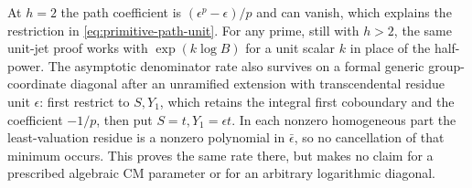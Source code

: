 \documentclass[11pt,a4paper]{article}
\theoremstyle{definition}\newtheorem{remark}[theorem]{Remark}
\begin{document}
At $h=2$ the path coefficient is $(\epsilon^p-\epsilon)/p$ and can vanish, which explains the restriction in \eqref{eq:primitive-path-unit}. For any prime, still with $h>2$, the same unit-jet proof works with $\exp(k\log B)$ for a unit scalar $k$ in place of the half-power. The asymptotic denominator rate also survives on a formal generic group-coordinate diagonal after an unramified extension with transcendental residue unit $\epsilon$: first restrict to $S,Y_1$, which retains the integral first coboundary and the coefficient $-1/p$, then put $S=t,Y_1=\epsilon t$. In each nonzero homogeneous part the least-valuation residue is a nonzero polynomial in $\bar\epsilon$, so no cancellation of that minimum occurs. This proves the same rate there, but makes no claim for a prescribed algebraic CM parameter or for an arbitrary logarithmic diagonal.
\end{document}
